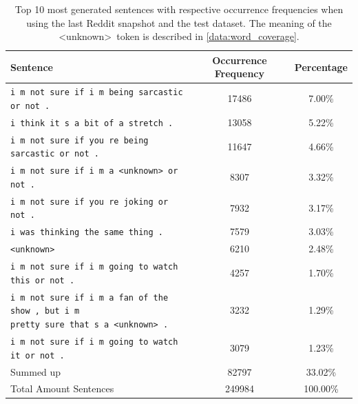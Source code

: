 \begin{table}[H]
	\centering
	\begin{adjustbox}{max width=\textwidth}
		\begin{tabular}{lcc}
			\toprule
			Sentence & Occurrence Frequency & Percentage\\ \midrule
			\texttt{i m not sure if i m being sarcastic or not .} & 17486 & 7.00\%\\
			\texttt{i think it s a bit of a stretch .} & 13058 & 5.22\%\\
			\texttt{i m not sure if you re being sarcastic or not .} & 11647 & 4.66\%\\
			\texttt{i m not sure if i m a <unknown> or not .} & 8307 & 3.32\%\\
			\texttt{i m not sure if you re joking or not .} & 7932 & 3.17\%\\
			\texttt{i was thinking the same thing .} & 7579 & 3.03\%\\
			\texttt{<unknown>} & 6210 & 2.48\%\\
			\texttt{i m not sure if i m going to watch this or not .} & 4257 & 1.70\%\\
			\specialcell{\texttt{i m not sure if i m a fan of the show , but i m}\\\texttt{pretty sure that s a <unknown> .}} & 3232 & 1.29\%\\
			\texttt{i m not sure if i m going to watch it or not .} & 3079 & 1.23\%\\
			\midrule
			Summed up & 82797 & 33.02\%\\
			\midrule
			\midrule
			Total Amount Sentences & 249984 & 100.00\%\\
			\bottomrule
		\end{tabular}
	\end{adjustbox}
	\caption{Top 10 most generated sentences with respective occurrence frequencies when using the last Reddit snapshot and the test dataset. The meaning of the \textless unknown\textgreater \ token is described in \ref{data:word_coverage}.}
	\label{results:test_performance:reddit_sample_outputs}
\end{table}


